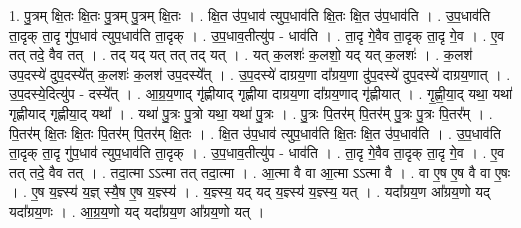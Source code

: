 \documentclass[17pt]{extarticle}
\begin{document}
1. पु॒त्रम् क्षि॒तः क्षि॒तः पु॒त्रम् पु॒त्रम् क्षि॒तः । . क्षि॒त उ॑प॒धाव॑ त्युप॒धाव॑ति क्षि॒तः क्षि॒त उ॑प॒धाव॑ति । . उ॒प॒धाव॑ति ता॒दृक् ता॒दृ गु॑प॒धाव॑ त्युप॒धाव॑ति ता॒दृक् । . उ॒प॒धाव॒तीत्यु॑प - धाव॑ति । . ता॒दृ गे॒वैव ता॒दृक् ता॒दृ गे॒व । . ए॒व तत् तदे॒ वैव तत् । . तद् यद् यत् तत् तद् यत् । . यत् क॒लशः॑ क॒लशो॒ यद् यत् क॒लशः॑ । . क॒लश॑ उप॒दस्ये॑ दुप॒दस्ये᳚त् क॒लशः॑ क॒लश॑ उप॒दस्ये᳚त् । . उ॒प॒दस्ये॑ दाग्रय॒णा दा᳚ग्रय॒णा दु॑प॒दस्ये॑ दुप॒दस्ये॑ दाग्रय॒णात् । . उ॒प॒दस्ये॒दित्यु॑प - दस्ये᳚त् । . आ॒ग्र॒य॒णाद् गृ॑ह्णीयाद् गृह्णीया दाग्रय॒णा दा᳚ग्रय॒णाद् गृ॑ह्णीयात् । . गृ॒ह्णी॒या॒द् यथा॒ यथा॑ गृह्णीयाद् गृह्णीया॒द् यथा᳚ । . यथा॑ पु॒त्रः पु॒त्रो यथा॒ यथा॑ पु॒त्रः । . पु॒त्रः पि॒तर॑म् पि॒तर॑म् पु॒त्रः पु॒त्रः पि॒तर᳚म् । . पि॒तर॑म् क्षि॒तः क्षि॒तः पि॒तर॑म् पि॒तर॑म् क्षि॒तः । . क्षि॒त उ॑प॒धाव॑ त्युप॒धाव॑ति क्षि॒तः क्षि॒त उ॑प॒धाव॑ति । . उ॒प॒धाव॑ति ता॒दृक् ता॒दृ गु॑प॒धाव॑ त्युप॒धाव॑ति ता॒दृक् । . उ॒प॒धाव॒तीत्यु॑प - धाव॑ति । . ता॒दृ गे॒वैव ता॒दृक् ता॒दृ गे॒व । . ए॒व तत् तदे॒ वैव तत् । . तदा॒त्मा ऽऽत्मा तत् तदा॒त्मा । . आ॒त्मा वै वा आ॒त्मा ऽऽत्मा वै । . वा ए॒ष ए॒ष वै वा ए॒षः । . ए॒ष य॒ज्ञ्स्य॑ य॒ज्ञ् स्यै॒ष ए॒ष य॒ज्ञ्स्य॑ । . य॒ज्ञ्स्य॒ यद् यद् य॒ज्ञ्स्य॑ य॒ज्ञ्स्य॒ यत् । . यदा᳚ग्रय॒ण आ᳚ग्रय॒णो यद् यदा᳚ग्रय॒णः । . आ॒ग्र॒य॒णो यद् यदा᳚ग्रय॒ण आ᳚ग्रय॒णो यत् । \newline
\end{document}
